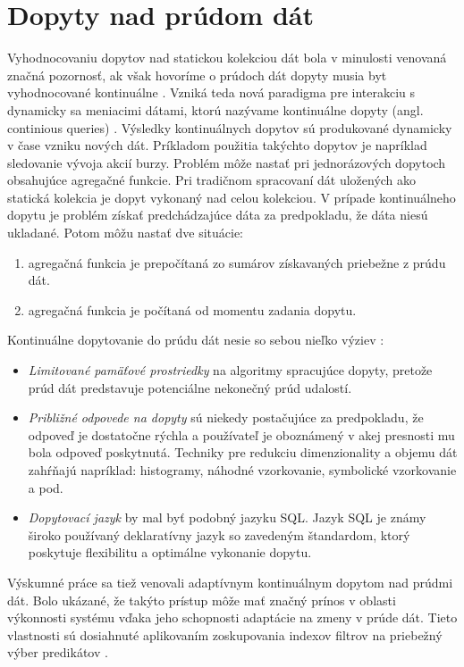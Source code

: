 \section{Dopyty nad prúdom dát}
Vyhodnocovaniu dopytov nad statickou kolekciou dát bola v minulosti venovaná značná pozornosť, ak však hovoríme o prúdoch dát dopyty musia byt vyhodnocované kontinuálne \citep{babu2001continuous, babcock2002models}. Vzniká teda nová paradigma pre interakciu s dynamicky sa meniacimi dátami, ktorú nazývame kontinuálne dopyty (angl. continious queries) \citep{babu2001continuous}. Výsledky kontinuálnych dopytov sú produkované dynamicky v čase vzniku nových dát. Príkladom použitia takýchto dopytov je napríklad sledovanie vývoja akcií burzy. Problém môže nastať pri jednorázových dopytoch obsahujúce agregačné funkcie. Pri tradičnom spracovaní dát uložených ako statická kolekcia je dopyt vykonaný nad celou kolekciou. V prípade kontinuálneho dopytu je problém získať predchádzajúce dáta za predpokladu, že dáta niesú ukladané. Potom môžu nastať dve situácie:
\begin{enumerate}
	\item agregačná funkcia je prepočítaná zo sumárov získavaných priebežne z prúdu dát.
	\item agregačná funkcia je počítaná od momentu zadania dopytu.
\end{enumerate}
Kontinuálne dopytovanie do prúdu dát nesie so sebou nieľko výziev \citep{babcock2002models}:
\begin{itemize}
	\item \textit{Limitované pamäťové prostriedky} na algoritmy spracujúce dopyty, pretože prúd dát predstavuje potenciálne nekonečný prúd udalostí.
	\item \textit{Približné odpovede na dopyty} sú niekedy postačujúce za predpokladu, že odpoveď je dostatočne rýchla a používateľ je oboznámený v akej presnosti mu bola odpoveď poskytnutá. Techniky pre redukciu dimenzionality a objemu dát zahŕňajú napríklad: histogramy, náhodné vzorkovanie, symbolické vzorkovanie a pod.
	\item \textit{Dopytovací jazyk} by mal byť podobný jazyku SQL. Jazyk SQL je známy široko používaný deklaratívny jazyk so zavedeným štandardom, ktorý poskytuje flexibilitu a optimálne vykonanie dopytu.
\end{itemize}
Výskumné práce sa tiež venovali adaptívnym kontinuálnym dopytom nad prúdmi dát. Bolo ukázané, že takýto prístup môže mať značný prínos v oblasti výkonnosti systému vďaka jeho schopnosti adaptácie na zmeny v prúde dát. Tieto vlastnosti sú dosiahnuté aplikovaním zoskupovania indexov filtrov na priebežný výber predikátov \citep{madden2002continuously}. 
